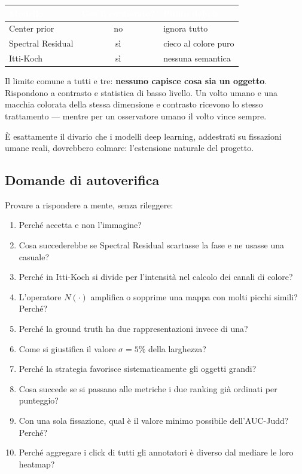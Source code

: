 \begin{center}
\begin{tabular}{l c l}
\toprule
\rowcolor{tblHead}\textcolor{white}{\textbf{Modello}} & \textcolor{white}{\textbf{Usa il contenuto?}} & \textcolor{white}{\textbf{Punto debole}} \\
\midrule
Center prior & no & ignora tutto \\
\rowcolor{tblAlt} Spectral Residual & sì & cieco al colore puro \\
Itti-Koch & sì & nessuna semantica \\
\bottomrule
\end{tabular}
\end{center}

Il limite comune a tutti e tre: \textbf{nessuno capisce cosa sia un oggetto}. Rispondono a
contrasto e statistica di basso livello. Un volto umano e una macchia colorata della stessa
dimensione e contrasto ricevono lo stesso trattamento --- mentre per un osservatore umano il
volto vince sempre.

È esattamente il divario che i modelli deep learning, addestrati su fissazioni umane reali,
dovrebbero colmare: l'estensione naturale del progetto.

\subsection{Domande di autoverifica}

\begin{nota}
Provare a rispondere a mente, senza rileggere:

\medskip
\begin{enumerate}
  \item Perché  accetta  e non l'immagine?
  \item Cosa succederebbe se Spectral Residual scartasse la fase e ne usasse una casuale?
  \item Perché in Itti-Koch si divide per l'intensità nel calcolo dei canali di colore?
  \item L'operatore $N(\cdot)$ amplifica o sopprime una mappa con molti picchi simili? Perché?
  \item Perché la ground truth ha due rappresentazioni invece di una?
  \item Come si giustifica il valore $\sigma = 5\%$ della larghezza?
  \item Perché la strategia  favorisce sistematicamente gli oggetti grandi?
  \item Cosa succede se si passano alle metriche i due ranking già ordinati per punteggio?
  \item Con una sola fissazione, qual è il valore minimo possibile dell'AUC-Judd? Perché?
  \item Perché aggregare i click di tutti gli annotatori è diverso dal mediare le loro heatmap?
\end{enumerate}
\end{nota}
